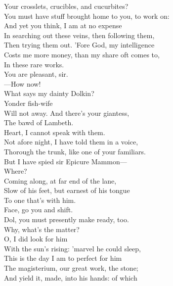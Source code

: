 \documentclass[a4paper,oneside]{memoir}
\begin{document}
\begin{drama*}
Your crosslets, crucibles, and cucurbites?\\
You must have stuff brought home to you, to work on:\\
And yet you think, I am at no expense\\
In searching out these veins, then following them,\\
Then trying them out. 'Fore God, my intelligence\\
Costs me more money, than my share oft comes to,\\
In these rare works.\\
\subtlespeaks {} You are pleasant, sir.\\
 ---How now!\\
What says my dainty Dolkin?\\
\dolspeaks {} Yonder fish-wife\\
Will not away. And there's your giantess,\\
The bawd of Lambeth.\\
\subtlespeaks {} Heart, I cannot speak with them.\\
\dolspeaks Not afore night, I have told them in a voice,\\
Thorough the trunk, like one of your familiars.\\
But I have spied sir Epicure Mammon---\\
\subtlespeaks Where?\\
\dolspeaks {} Coming along, at far end of the lane,\\
Slow of his feet, but earnest of his tongue\\
To one that's with him.\\
\subtlespeaks {} Face, go you and shift.\\
Dol, you must presently make ready, too.\\
\dolspeaks Why, what's the matter?\\
\subtlespeaks {} O, I did look for him\\
With the sun's rising: 'marvel he could sleep,\\
This is the day I am to perfect for him\\
The magisterium, our great work, the stone;\\
And yield it, made, into his hands: of which\\

\end{drama*}
\end{document}
